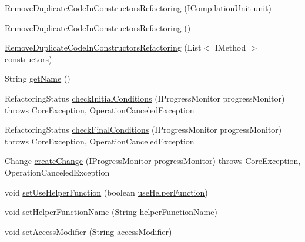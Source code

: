 \begin{DoxyCompactItemize}
\item 
\hyperlink{classedu_1_1illinois_1_1canistelCassabanana_1_1RemoveDuplicateCodeInConstructorsRefactoring_a5ff873e3fba88513f81c2c3fe23cf51a}{RemoveDuplicateCodeInConstructorsRefactoring} (ICompilationUnit unit)
\item 
\hyperlink{classedu_1_1illinois_1_1canistelCassabanana_1_1RemoveDuplicateCodeInConstructorsRefactoring_aebc7814b847d4d25f8ba6121b814b26d}{RemoveDuplicateCodeInConstructorsRefactoring} ()
\item 
\hyperlink{classedu_1_1illinois_1_1canistelCassabanana_1_1RemoveDuplicateCodeInConstructorsRefactoring_a7eedf12b934fab81ef08d119179b2392}{RemoveDuplicateCodeInConstructorsRefactoring} (List$<$ IMethod $>$ \hyperlink{classedu_1_1illinois_1_1canistelCassabanana_1_1RemoveDuplicateCodeInConstructorsRefactoring_a9d31c4c2b04e3ed5a8450714a08f1381}{constructors})
\item 
String \hyperlink{classedu_1_1illinois_1_1canistelCassabanana_1_1RemoveDuplicateCodeInConstructorsRefactoring_a37547064d6f23ee40520d75163f9b72a}{getName} ()
\item 
RefactoringStatus \hyperlink{classedu_1_1illinois_1_1canistelCassabanana_1_1RemoveDuplicateCodeInConstructorsRefactoring_aa580002594ce1e30688c69ecf4cc9997}{checkInitialConditions} (IProgressMonitor progressMonitor)  throws CoreException, 			OperationCanceledException 
\item 
RefactoringStatus \hyperlink{classedu_1_1illinois_1_1canistelCassabanana_1_1RemoveDuplicateCodeInConstructorsRefactoring_aea338e1a0b659532042e5d36ad52aa00}{checkFinalConditions} (IProgressMonitor progressMonitor)  throws CoreException, 			OperationCanceledException 
\item 
Change \hyperlink{classedu_1_1illinois_1_1canistelCassabanana_1_1RemoveDuplicateCodeInConstructorsRefactoring_a903da4ed01d98cf13d3b1713dad531e3}{createChange} (IProgressMonitor progressMonitor)  throws CoreException, 			OperationCanceledException 
\item 
void \hyperlink{classedu_1_1illinois_1_1canistelCassabanana_1_1RemoveDuplicateCodeInConstructorsRefactoring_ade06f230853f39b5e1e8c70409cdee13}{setUseHelperFunction} (boolean \hyperlink{classedu_1_1illinois_1_1canistelCassabanana_1_1RemoveDuplicateCodeInConstructorsRefactoring_ac3d10235e0a51b7d76e5a34233a842ae}{useHelperFunction})
\item 
void \hyperlink{classedu_1_1illinois_1_1canistelCassabanana_1_1RemoveDuplicateCodeInConstructorsRefactoring_adf96ad20c502346fd96e320555e84bd6}{setHelperFunctionName} (String \hyperlink{classedu_1_1illinois_1_1canistelCassabanana_1_1RemoveDuplicateCodeInConstructorsRefactoring_aeec592ffa5b5903205515925d84c2bb8}{helperFunctionName})
\item 
void \hyperlink{classedu_1_1illinois_1_1canistelCassabanana_1_1RemoveDuplicateCodeInConstructorsRefactoring_a95daed56e8f4bba46b7bc1b7b30316cd}{setAccessModifier} (String \hyperlink{classedu_1_1illinois_1_1canistelCassabanana_1_1RemoveDuplicateCodeInConstructorsRefactoring_ac98e605acbaebe4c90d19de7baae3798}{accessModifier})
\end{DoxyCompactItemize}
